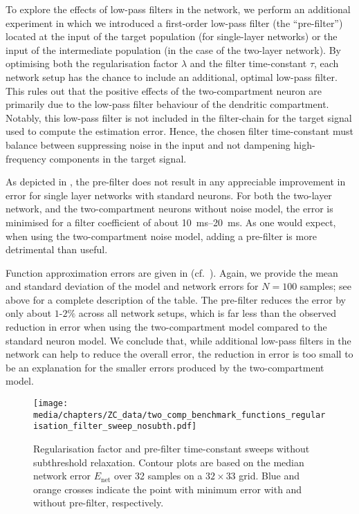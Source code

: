 To explore the effects of low-pass filters in the network, we perform an additional experiment in which we introduced a first-order low-pass filter (the \enquote{pre-filter}) located at the input of the target population (for single-layer networks) or the input of the intermediate population (in the case of the two-layer network).
By optimising both the regularisation factor $\lambda$ and the filter time-constant $\tau$, each network setup has the chance to include an additional, optimal low-pass filter.
This rules out that the positive effects of the two-compartment neuron are primarily due to the low-pass filter behaviour of the dendritic compartment.
Notably, this low-pass filter is not included in the filter-chain for the target signal used to compute the estimation error.
Hence, the chosen filter time-constant must balance between suppressing noise in the input and not dampening high-frequency components in the target signal.

As depicted in , the pre-filter does not result in any appreciable improvement in error for single layer networks with standard \LIF neurons.
For both the two-layer \LIF network, and the two-compartment \LIF neurons without noise model, the error is minimised for a filter coefficient of about \SIrange{10}{20}{\milli\second}.
As one would expect, when using the two-compartment \LIF noise model, adding a pre-filter is more detrimental than useful.

Function approximation errors are given in (cf.~).
Again, we provide the mean and standard deviation of the model and network errors for $N = 100$ samples; see above for a complete description of the table.
The pre-filter reduces the error by only about $1$-$2\%$ across all network setups, which is far less than the observed reduction in error when using the two-compartment model compared to the standard \LIF neuron model.
We conclude that, while additional low-pass filters in the network can help to reduce the overall error, the reduction in error is too small to be an explanation for the smaller errors produced by the two-compartment model.

\begin{figure}[p]
	\texttt{[image: media/chapters/ZC\_data/two\_comp\_benchmark\_functions\_regularisation\_filter\_sweep\_nosubth.pdf]}
	\caption[Regularisation factor and pre-filter time-constant sweeps without subthreshold relaxation]{Regularisation factor and pre-filter time-constant sweeps without subthreshold relaxation. Contour plots are based on the median network error $E_\mathrm{net}$ over 32 samples on a $32 \times 33$ grid. Blue and orange crosses indicate the point with minimum error with and without pre-filter, respectively.}
	\label{fig:regularization_parameter_sweep_nosubth}
\end{figure}

